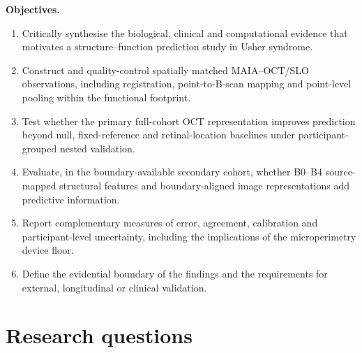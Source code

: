 \textbf{Objectives.}
\begin{enumerate}
  \item Critically synthesise the biological, clinical and computational evidence that motivates a structure--function prediction study in Usher syndrome.
  \item Construct and quality-control spatially matched MAIA--OCT/SLO observations, including registration, point-to-B-scan mapping and point-level pooling within the functional footprint.
  \item Test whether the primary full-cohort OCT representation improves prediction beyond null, fixed-reference and retinal-location baselines under participant-grouped nested validation.
  \item Evaluate, in the boundary-available secondary cohort, whether B0--B4 source-mapped structural features and boundary-aligned image representations add predictive information.
  \item Report complementary measures of error, agreement, calibration and participant-level uncertainty, including the implications of the microperimetry device floor.
  \item Define the evidential boundary of the findings and the requirements for external, longitudinal or clinical validation.
\end{enumerate}

\section{Research questions}


